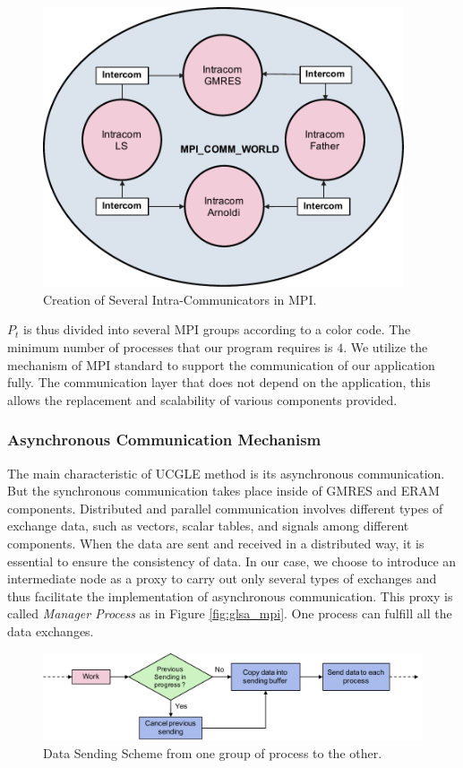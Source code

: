 \begin{figure}
	\centering
	\includegraphics[width=4.2in]{fig/UCGLE_COMM_WORLD.pdf}
	\caption{Creation of Several Intra-Communicators in MPI.}
	\label{fig:ucgle_comm_world}
\end{figure}


$P_t$ is thus divided into several MPI groups according to a color code. The minimum number of processes that our program requires is $4$. We utilize the mechanism of MPI standard to support the communication of our application fully. The communication layer that does not depend on the application, this allows the replacement and scalability of various components provided.

\subsubsection{Asynchronous Communication Mechanism}

The main characteristic of UCGLE method is its asynchronous communication. But the synchronous communication takes place inside of GMRES and ERAM components. Distributed and parallel communication involves different types of exchange data, such as vectors, scalar tables, and signals among different components. When the data are sent and received in a distributed way, it is essential to ensure the consistency of data. In our case, we choose to introduce an intermediate node as a proxy to carry out only several types of exchanges and thus facilitate the implementation of asynchronous communication. This proxy is called \textit{Manager Process} as in Figure \ref{fig:glsa_mpi}. One process can fulfill all the data exchanges.

\begin{figure}
	\centering
	\includegraphics[width=6.2in]{fig/send.pdf}
	\caption{Data Sending Scheme from one group of process to the other.}
	\label{fig:send}
\end{figure}

